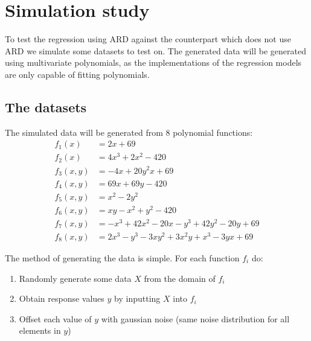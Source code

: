 \documentclass[12pt]{article}
\begin{document}
\section{Simulation study}
    To test the regression using ARD against the counterpart which does not use ARD we simulate some datasets to test on. The generated data will be generated using multivariate polynomials, as the implementations of the regression models are only capable of fitting polynomials.

    \subsection{The datasets}
        The simulated data will be generated from $8$ polynomial functions:
        \begin{align}
            f_1(x)&=2x+69 \label{eq:f1}\\
            f_2(x)&=4x^3+2x^2-420 \label{eq:f2}\\
            f_3(x,y)&=-4x+20y^2x+69 \label{eq:f3}\\
            f_4(x,y)&=69x+69y-420 \label{eq:f4}\\
            f_5(x,y)&=x^2-2y^2 \label{eq:f5}\\
            f_6(x,y)&=xy-x^2+y^2-420 \label{eq:f6}\\
            f_7(x,y)&=-x^3+42x^2-20x-y^3+42y^2-20y+69 \label{eq:f7}\\
            f_8(x,y)&=2x^3-y^3-3xy^2+3x^2y+x^3-3yx+69 \label{eq:f8}
        \end{align}

        The method of generating the data is simple. For each function $f_i$ do:
        \begin{enumerate}
            \item Randomly generate some data $X$ from the domain of $f_i$
            \item Obtain response values $y$ by inputting $X$ into $f_i$
            \item Offset each value of $y$ with gaussian noise (same noise distribution for all elements in $y$)
        \end{enumerate}
\end{document}
